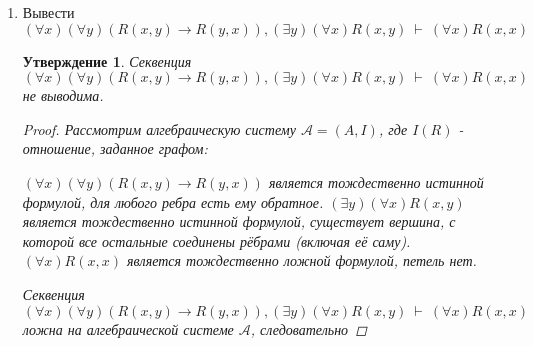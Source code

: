 \documentclass[12pt,a4paper]{article}
\newtheorem{proposition}{Утверждение}
\def\fCenter{\ \vdash\ }
\begin{document}
\begin{enumerate}
\item Вывести $(\forall x)(\forall y)(R(x,y)\to R(y,x)),(\exists y)(\forall x)R(x,y)\fCenter (\forall x)R(x,x)$

\begin{proposition}
Секвенция $(\forall x)(\forall y)(R(x,y)\to R(y,x)),(\exists y)(\forall x)R(x,y)\fCenter (\forall x)R(x,x)$ не выводима.
\begin{proof}
Рассмотрим алгебраическую систему $\mathcal{A}=(A,I)$, где $I(R)$ - отношение, заданное графом:


$(\forall x)(\forall y)(R(x,y)\to R(y,x))$ является тождественно истинной формулой, для любого ребра есть ему обратное. $(\exists y)(\forall x)R(x,y)$ является тождественно истинной формулой, существует вершина, с которой все остальные соединены рёбрами (включая её саму). $(\forall x)R(x,x)$ является тождественно ложной формулой, петель нет.

Секвенция $(\forall x)(\forall y)(R(x,y)\to R(y,x)),(\exists y)(\forall x)R(x,y)\fCenter (\forall x)R(x,x)$ ложна на алгебраической системе $\mathcal{A}$, следовательно
\end{proof}


\end{proposition}
\end{enumerate}
\end{document}
